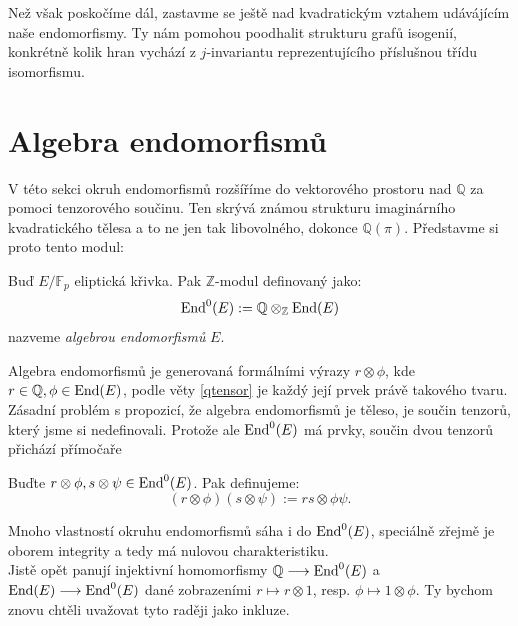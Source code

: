 \documentclass [12pt]{report}
\begin{document}
Než však poskočíme dál, zastavme se ještě nad kvadratickým vztahem udávájícím naše endomorfismy. Ty nám pomohou poodhalit strukturu grafů isogenií, konkrétně kolik hran vychází z $j$-invariantu reprezentujícího příslušnou třídu isomorfismu.

\section{Algebra endomorfismů}

V této sekci okruh endomorfismů rozšíříme do vektorového prostoru nad $\mathbb{Q}$ za pomoci tenzorového součinu. Ten skrývá známou strukturu imaginárního kvadratického tělesa a to ne jen tak libovolného, dokonce $\mathbb{Q}(\pi)$. Představme si proto tento modul:\\

\begin{definice}
Buď $E/\mathbb{F}_p$ eliptická křivka. Pak $\mathbb{Z}$-modul definovaný jako:
\begin{equation*}
\operatorname{End}^0 (E) := \mathbb{Q} \otimes_{\mathbb{Z}} \operatorname{End}(E)
\end{equation*}
nazveme \textit{algebrou endomorfismů} $E$.
\end{definice}

Algebra endomorfismů je generovaná formálními výrazy $r \otimes \phi$, kde $r \in \mathbb{Q}, \phi \in \operatorname{End}(E)$, podle věty \ref{qtensor} je každý její prvek právě takového tvaru. Zásadní problém s propozicí, že algebra endomorfismů je těleso, je součin tenzorů, který jsme si nedefinovali. Protože ale $\operatorname{End}^0 (E)$ má  prvky, součin dvou tenzorů přichází přímočaře 
\begin{definice}
Buďte $r \otimes \phi, s \otimes \psi \in \operatorname{End}^0(E)$. Pak definujeme:
\begin{equation*}
(r \otimes \phi) (s \otimes \psi) := rs \otimes \phi \psi.
\end{equation*} 
\end{definice}

Mnoho vlastností okruhu endomorfismů sáha i do $\operatorname{End}^0 (E)$, speciálně zřejmě je oborem integrity a tedy má nulovou charakteristiku.\\

Jistě opět panují injektivní homomorfismy $\mathbb{Q} \longrightarrow \operatorname{End}^0 (E)$ a $\operatorname{End}(E) \longrightarrow \operatorname{End}^0 (E)$ dané zobrazeními $r \mapsto r \otimes 1$, resp. $\phi \mapsto 1 \otimes \phi$. Ty bychom znovu chtěli uvažovat tyto raději jako inkluze.
\end{document}
